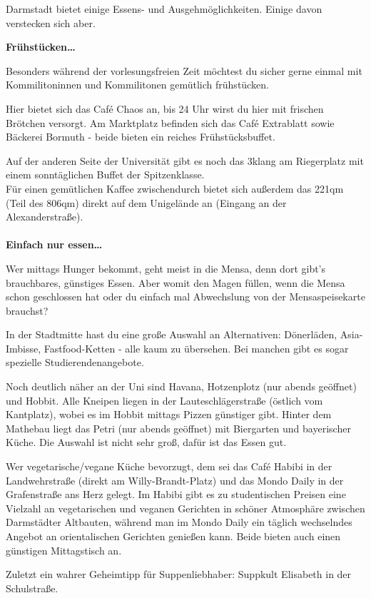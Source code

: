 {Darmstadt bietet einige Essens- und Ausgehmöglichkeiten. Einige davon verstecken sich aber.
}{
    \textbf{Frühstücken…}

    Besonders während der vorlesungsfreien Zeit möchtest du sicher gerne einmal mit Kommilitoninnen und Kommilitonen gemütlich frühstücken.

    Hier bietet sich das Caf\'e Chaos an, bis 24 Uhr wirst du hier mit frischen Brötchen versorgt. Am Marktplatz befinden sich das Caf\'e Extrablatt sowie Bäckerei Bormuth - beide bieten ein reiches Frühstücksbuffet.

    Auf der anderen Seite der Universität gibt es noch das 3klang am Riegerplatz mit einem sonntäglichen Buffet der Spitzenklasse.\\
    Für einen gemütlichen Kaffee zwischendurch bietet sich außerdem das 221qm (Teil des 806qm) direkt auf dem Unigelände an (Eingang an der Alexanderstraße).
    \\\\
    \textbf{Einfach nur essen…}

    Wer mittags Hunger bekommt, geht meist in die Mensa, denn dort gibt's brauchbares, günstiges Essen. Aber womit den Magen füllen, wenn die Mensa schon geschlossen hat oder du einfach mal Abwechslung von der Mensaspeisekarte brauchst?

    In der Stadtmitte hast du eine große Auswahl an Alternativen: Dönerläden, Asia-Imbisse, Fastfood-Ketten - alle kaum zu übersehen. Bei manchen gibt es sogar spezielle Studierendenangebote.

    Noch deutlich näher an der Uni sind Havana, Hotzenplotz (nur abends geöffnet) und Hobbit. Alle Kneipen liegen in der Lauteschlägerstraße (östlich vom Kantplatz), wobei es im Hobbit mittags Pizzen günstiger gibt. Hinter dem Mathebau liegt das Petri (nur abends geöffnet) mit Biergarten und bayerischer Küche. Die Auswahl ist nicht sehr groß, dafür ist das Essen gut.

    Wer vegetarische/vegane Küche bevorzugt, dem sei das Café Habibi in der Landwehrstraße (direkt am Willy-Brandt-Platz) und das Mondo Daily in der Grafenstraße ans Herz gelegt. Im Habibi gibt es zu studentischen Preisen eine Vielzahl an vegetarischen und veganen Gerichten in schöner Atmosphäre zwischen Darmstädter Altbauten, während man im Mondo Daily ein täglich wechselndes Angebot an orientalischen Gerichten genießen kann.
    Beide bieten auch einen günstigen Mittagstisch an.

    Zuletzt ein wahrer Geheimtipp für Suppenliebhaber: Suppkult Elisabeth in der Schulstraße.\\

}
